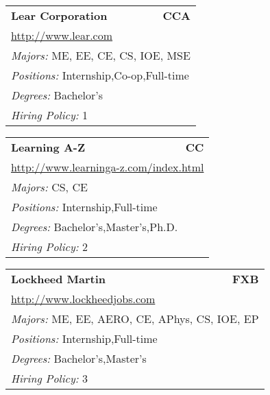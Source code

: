 \documentclass[twoside]{article}
\begin{document}
\begin{center}
\begin{multicols}{3}
\begin{FlushLeft}
\begin{minipage}{.9\columnwidth}
\end{minipage}
 
\begin{minipage}{.9\columnwidth}\begin{tabularx}{.95\columnwidth}{Xr}
                 {\Large\bf Lear Corporation} & {\Large\bf CCA}\\
    \multicolumn{2}{p{.95\columnwidth}}{\url{http://www.lear.com}}\\
    \multicolumn{2}{p{.95\columnwidth}}{\emph{Majors:} ME, EE, CE, CS, IOE, MSE}\\
    \multicolumn{2}{p{.95\columnwidth}}{\emph{Positions:} Internship,Co-op,Full-time}\\
    \multicolumn{2}{p{.95\columnwidth}}{\emph{Degrees:} Bachelor's}\\
    \multicolumn{2}{p{.95\columnwidth}}{\emph{Hiring Policy:} 1}\\
    \end{tabularx}
    
\end{minipage}
 
\begin{minipage}{.9\columnwidth}\begin{tabularx}{.95\columnwidth}{Xr}
                 {\Large\bf Learning A-Z} & {\Large\bf CC}\\
    \multicolumn{2}{p{.95\columnwidth}}{\url{http://www.learninga-z.com/index.html}}\\
    \multicolumn{2}{p{.95\columnwidth}}{\emph{Majors:} CS, CE}\\
    \multicolumn{2}{p{.95\columnwidth}}{\emph{Positions:} Internship,Full-time}\\
    \multicolumn{2}{p{.95\columnwidth}}{\emph{Degrees:} Bachelor's,Master's,Ph.D.}\\
    \multicolumn{2}{p{.95\columnwidth}}{\emph{Hiring Policy:} 2}\\
    \end{tabularx}
    
\end{minipage}
 
\begin{minipage}{.9\columnwidth}\begin{tabularx}{.95\columnwidth}{Xr}
                 {\Large\bf Lockheed Martin} & {\Large\bf FXB}\\
    \multicolumn{2}{p{.95\columnwidth}}{\url{http://www.lockheedjobs.com}}\\
    \multicolumn{2}{p{.95\columnwidth}}{\emph{Majors:} ME, EE, AERO, CE, APhys, CS, IOE, EP}\\
    \multicolumn{2}{p{.95\columnwidth}}{\emph{Positions:} Internship,Full-time}\\
    \multicolumn{2}{p{.95\columnwidth}}{\emph{Degrees:} Bachelor's,Master's}\\
    \multicolumn{2}{p{.95\columnwidth}}{\emph{Hiring Policy:} 3}\\
    \end{tabularx}
    

\end{minipage}
\end{FlushLeft}
\end{multicols}
\end{center}
\end{document}

